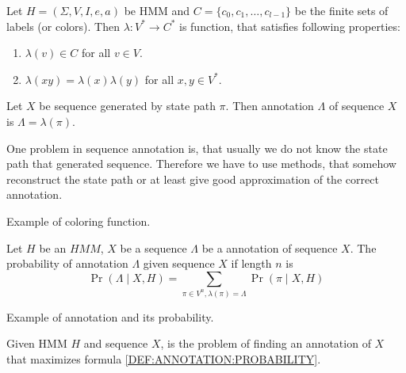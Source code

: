 
\begin{definition}
Let $H=(\Sigma,V,I,e,a)$ be HMM and $C=\{c_0,c_1,\dots,c_{l-1}\}$ be the finite
sets of labels (or colors). Then  
$\lambda: V^*\to C^*$ is function, that satisfies following properties:
\begin{enumerate}
\item $\lambda(v)\in C$ for all $v\in V$.
\item $\lambda(xy) = \lambda(x)\lambda(y)$ for all $x,y\in V^*$.
\end{enumerate}

Let $X$ be sequence generated by state path $\pi$. Then annotation
$\Lambda$ of sequence $X$ is $\Lambda = \lambda(\pi)$.
\end{definition}

One problem in sequence annotation is, that usually we do not know the state
path that generated sequence. Therefore we have to use methods, that somehow
reconstruct the state path or at least give good approximation of the correct
annotation. 

\begin{example}
Example of coloring function.
\end{example}


\begin{definition}
Let $H$ be an $HMM$, $X$ be a sequence $\Lambda$ be a annotation of sequence
$X$. The probability of annotation $\Lambda$ given sequence $X$ if length $n$ is 
\begin{equation}
\Pr\left(\Lambda\mid X,H\right)=\sum_{\pi \in V^n,\lambda(\pi) =
\Lambda}\Pr\left(\pi\mid X,H \right)\label{DEF:ANNOTATION:PROBABILITY}
\end{equation}
\end{definition}

\begin{example}
Example of annotation and its probability.
\end{example}

\begin{definition}
Given HMM $H$ and sequence $X$,  is the problem of finding an annotation of $X$ that maximizes
formula \ref{DEF:ANNOTATION:PROBABILITY}.
\end{definition}

